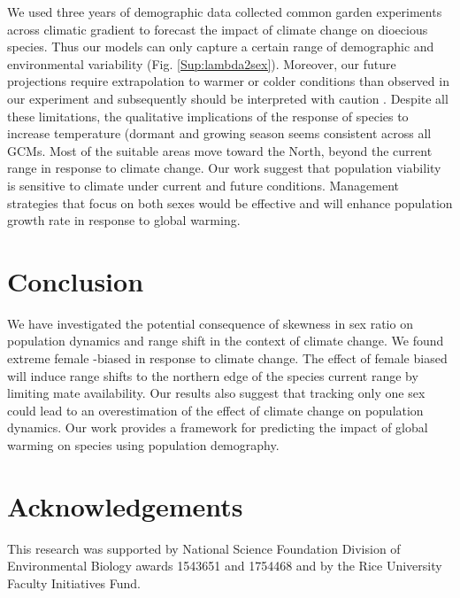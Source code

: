\documentclass[12pt]{article}
\newcommand{\tom}[2]{{\color{red}{#1}}\footnote{\textit{\color{red}{#2}}}}
\begin{document}
We used three years of demographic data collected common garden experiments across climatic gradient to forecast the impact of climate change on dioecious species.
Thus our models can only capture a certain range of demographic and environmental variability (Fig. \ref{Sup:lambda2sex}).
Moreover, our future projections require extrapolation to warmer or colder conditions than observed in our experiment and subsequently should be interpreted with caution \citep{chen2024influence}.
Despite all these limitations, the qualitative implications of the response of species to increase temperature (dormant and growing season seems consistent across all GCMs.  
Most of the suitable areas move toward the North, beyond the current range in response to climate change.
Our work suggest that population viability is sensitive to climate under current  and future conditions. 
Management strategies that focus on both sexes would be effective and will enhance population growth rate in response to global warming. 

\section*{Conclusion}
We have investigated the potential consequence of skewness in sex ratio on population dynamics and range shift in the context of climate change. 
We found extreme female -biased in response to climate change. 
The effect of female biased will induce range shifts to the northern edge of the species current range by limiting mate availability.   
Our results also suggest that tracking only one sex could lead to an overestimation of the effect of climate change on population dynamics. 
Our work  provides a framework for predicting the impact of global warming on species using population demography. 

\section*{Acknowledgements}
This research was supported by National Science Foundation Division of Environmental Biology awards 1543651 and 1754468 and by the Rice University Faculty Initiatives Fund.
\end{document}
